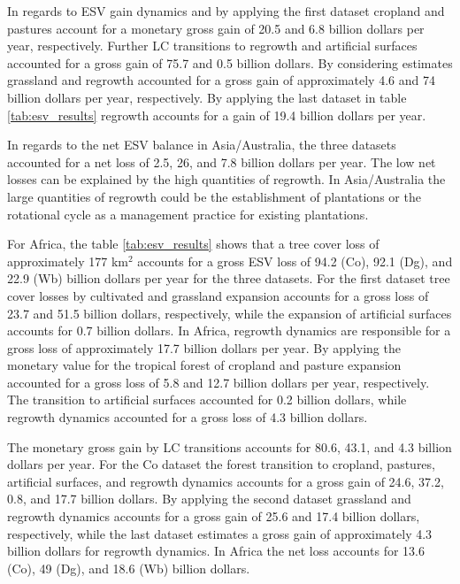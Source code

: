 		In regards to \ac{ESV} gain dynamics and by applying the first dataset cropland and pastures account for a monetary gross gain of 20.5 and 6.8 billion dollars per year, respectively. Further \ac{LC} transitions to regrowth and artificial surfaces accounted for a gross gain of 75.7 and 0.5 billion dollars. By considering \citet{Groot2012} estimates grassland and regrowth accounted for a gross gain of approximately 4.6 and 74 billion dollars per year, respectively. By applying the last dataset in table \ref{tab:esv_results} regrowth accounts for a gain of 19.4 billion dollars per year.

		In regards to the net \ac{ESV} balance in Asia/Australia, the three datasets accounted for a net loss of 2.5, 26, and 7.8 billion dollars per year. The low net losses can be explained by the high quantities of regrowth. In Asia/Australia the large quantities of regrowth could be the establishment of plantations or the rotational cycle as a management practice for existing plantations.

		For Africa, the table \ref{tab:esv_results} shows that a tree cover loss of approximately 177 km$^2$ accounts for a gross \ac{ESV} loss of 94.2 (Co), 92.1 (Dg), and 22.9 (Wb) billion dollars per year for the three datasets. For the first dataset tree cover losses by cultivated and grassland expansion accounts for a gross loss of 23.7 and 51.5 billion dollars, respectively, while the expansion of artificial surfaces accounts for 0.7 billion dollars. In Africa, regrowth dynamics are responsible for a gross loss of approximately 17.7 billion dollars per year. By applying the monetary value for the tropical forest of \citet{Siikamaki2015} cropland and pasture expansion accounted for a gross loss of 5.8 and 12.7 billion dollars per year, respectively. The transition to artificial surfaces accounted for 0.2 billion dollars, while regrowth dynamics accounted for a gross loss of 4.3 billion dollars. 

		The monetary gross gain by \ac{LC} transitions accounts for 80.6, 43.1, and 4.3 billion dollars per year. For the Co dataset the forest transition to cropland, pastures, artificial surfaces, and regrowth dynamics accounts for a gross gain of 24.6, 37.2, 0.8, and 17.7 billion dollars. By applying the second dataset grassland and regrowth dynamics accounts for a gross gain of 25.6 and 17.4 billion dollars, respectively, while the last dataset estimates a gross gain of approximately 4.3 billion dollars for regrowth dynamics. In Africa the net loss accounts for 13.6 (Co), 49 (Dg), and 18.6 (Wb) billion dollars.

